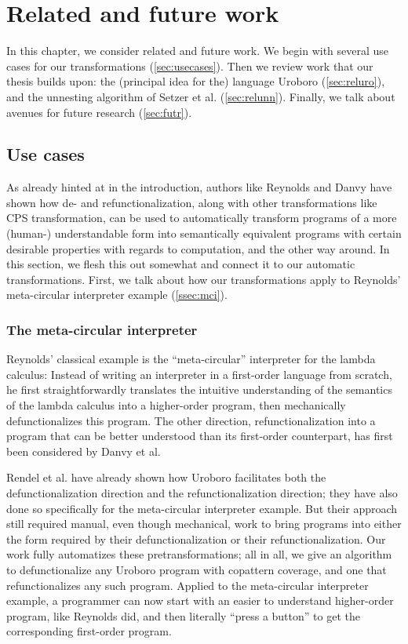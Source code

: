 \chapter{Related and future work}

In this chapter, we consider related and future work. We begin with several use cases for our transformations (\autoref{sec:usecases}). Then we review work that our thesis builds upon: the (principal idea for the) language Uroboro (\autoref{sec:reluro}), and the unnesting algorithm of Setzer et al. (\autoref{sec:relunn}). Finally, we talk about avenues for future research (\autoref{sec:futr}).

\section{Use cases}
\label{sec:usecases}

As already hinted at in the introduction, authors like Reynolds and Danvy have shown how de- and refunctionalization, along with other transformations like CPS transformation, can be used to automatically transform programs of a more (human-) understandable form into semantically equivalent programs with certain desirable properties with regards to computation, and the other way around. In this section, we flesh this out somewhat and connect it to our automatic transformations. First, we talk about how our transformations apply to Reynolds' meta-circular interpreter example (\autoref{ssec:mci}). 

\subsection{The meta-circular interpreter}
\label{ssec:mci}

Reynolds' classical example is the ``meta-circular'' interpreter for the lambda calculus: Instead of writing an interpreter in a first-order language from scratch, he first straightforwardly translates the intuitive understanding of the semantics of the lambda calculus into a higher-order program, then mechanically defunctionalizes this program. The other direction, refunctionalization into a program that can be better understood than its first-order counterpart, has first been considered by Danvy et al.

Rendel et al. have already shown how Uroboro facilitates both the defunctionalization direction and the refunctionalization direction; they have also done so specifically for the meta-circular interpreter example. But their approach still required manual, even though mechanical, work to bring programs into either the form required by their defunctionalization or their refunctionalization. Our work fully automatizes these pretransformations; all in all, we give an algorithm to defunctionalize any Uroboro program with copattern coverage, and one that refunctionalizes any such program. Applied to the meta-circular interpreter example, a programmer can now start with an easier to understand higher-order program, like Reynolds did, and then literally ``press a button'' to get the corresponding first-order program.

